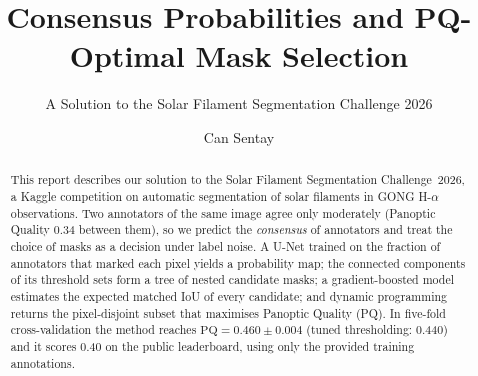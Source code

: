 \documentclass[sigconf]{acmart}
\begin{document}
\title{Consensus Probabilities and PQ-Optimal Mask Selection}  %
\subtitle{A Solution to the Solar Filament Segmentation Challenge 2026} %


\author{Can Sentay}

\begin{abstract}
    This report describes our solution to the Solar Filament Segmentation Challenge~2026, a Kaggle competition on automatic segmentation of solar filaments in GONG H-$\alpha$ observations. Two annotators of the same image agree only moderately (Panoptic Quality 0.34 between them), so we predict the \emph{consensus} of annotators and treat the choice of masks as a decision under label noise. A U-Net trained on the fraction of annotators that marked each pixel yields a probability map; the connected components of its threshold sets form a tree of nested candidate masks; a gradient-boosted model estimates the expected matched IoU of every candidate; and dynamic programming returns the pixel-disjoint subset that maximises Panoptic Quality (PQ). In five-fold cross-validation the method reaches $\mathrm{PQ}=0.460\pm0.004$ (tuned thresholding: 0.440) and it scores 0.40 on the public leaderboard, using only the provided training annotations.
\end{abstract}

\maketitle

\ifguideStyle
{}
\par\medskip
\fi

\end{document}
